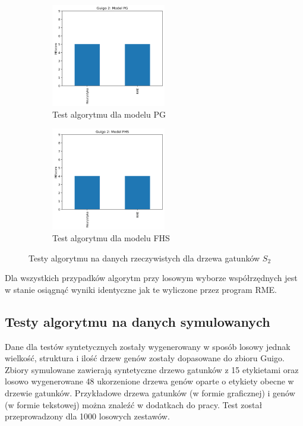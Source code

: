 \documentclass[licencjacka]{pracamgr}
\begin{document}
\begin{figure}[H]
\centering
\begin{subfigure}{.5\textwidth}
  \centering
  \includegraphics[width=50mm]{./pictures/G2_PG.png}
  \caption{Test algorytmu dla modelu PG}
  \label{fig:sub2}
\end{subfigure}%
\begin{subfigure}{.5\textwidth}
  \centering
  \includegraphics[width=50mm]{./pictures/G2_FHS.png}
  \caption{Test algorytmu dla modelu FHS}
  \label{fig:sub1}
\end{subfigure}%
\caption{Testy algorytmu na danych rzeczywistych dla drzewa gatunków $S_2$}
\label{fig:test}
\end{figure}

Dla wszystkich przypadków algorytm przy losowym wyborze współrzędnych jest w stanie osiągnąć wyniki identyczne jak te wyliczone przez program RME. 

\subsection{Testy algorytmu na danych symulowanych}
Dane dla testów syntetycznych zostały wygenerowany w sposób losowy jednak wielkość, struktura i ilość drzew genów zostały dopasowane do zbioru Guigo. Zbiory symulowane zawierają syntetyczne drzewo gatunków z 15 etykietami oraz losowo wygenerowane 48 ukorzenione drzewa genów oparte o etykiety obecne w drzewie gatunków. Przykładowe drzewa gatunków (w formie graficznej) i genów (w formie tekstowej) można znaleźć w dodatkach do pracy. Test został przeprowadzony dla 1000 losowych zestawów.
\end{document}
